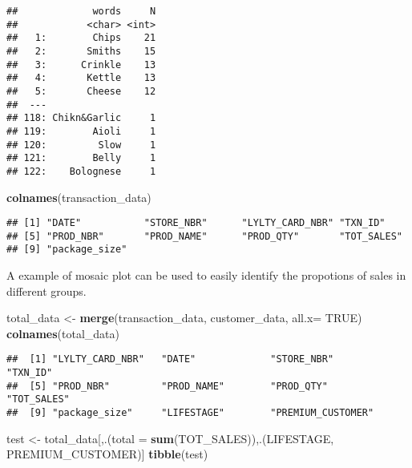 \documentclass[
]{article}
\newenvironment{Shaded}{\begin{snugshade}}{\end{snugshade}}
\newcommand{\AttributeTok}[1]{\textcolor[rgb]{0.13,0.29,0.53}{#1}}
\newcommand{\ConstantTok}[1]{\textcolor[rgb]{0.56,0.35,0.01}{#1}}
\newcommand{\FunctionTok}[1]{\textcolor[rgb]{0.13,0.29,0.53}{\textbf{#1}}}
\newcommand{\NormalTok}[1]{#1}
\newcommand{\OtherTok}[1]{\textcolor[rgb]{0.56,0.35,0.01}{#1}}
\begin{document}
\begin{verbatim}
##             words     N
##            <char> <int>
##   1:        Chips    21
##   2:       Smiths    15
##   3:      Crinkle    13
##   4:       Kettle    13
##   5:       Cheese    12
##  ---                   
## 118: Chikn&Garlic     1
## 119:        Aioli     1
## 120:         Slow     1
## 121:        Belly     1
## 122:    Bolognese     1
\end{verbatim}

\begin{Shaded}
\begin{Highlighting}[]
\FunctionTok{colnames}\NormalTok{(transaction\_data)}
\end{Highlighting}
\end{Shaded}

\begin{verbatim}
## [1] "DATE"           "STORE_NBR"      "LYLTY_CARD_NBR" "TXN_ID"        
## [5] "PROD_NBR"       "PROD_NAME"      "PROD_QTY"       "TOT_SALES"     
## [9] "package_size"
\end{verbatim}

A example of mosaic plot can be used to easily identify the propotions
of sales in different groups.

\begin{Shaded}
\begin{Highlighting}[]
\NormalTok{total\_data }\OtherTok{\textless{}{-}} \FunctionTok{merge}\NormalTok{(transaction\_data, customer\_data, }\AttributeTok{all.x=} \ConstantTok{TRUE}\NormalTok{)}
\FunctionTok{colnames}\NormalTok{(total\_data)}
\end{Highlighting}
\end{Shaded}

\begin{verbatim}
##  [1] "LYLTY_CARD_NBR"   "DATE"             "STORE_NBR"        "TXN_ID"          
##  [5] "PROD_NBR"         "PROD_NAME"        "PROD_QTY"         "TOT_SALES"       
##  [9] "package_size"     "LIFESTAGE"        "PREMIUM_CUSTOMER"
\end{verbatim}

\begin{Shaded}
\begin{Highlighting}[]
\NormalTok{test }\OtherTok{\textless{}{-}}\NormalTok{ total\_data[,.(}\AttributeTok{total =} \FunctionTok{sum}\NormalTok{(TOT\_SALES)),.(LIFESTAGE, PREMIUM\_CUSTOMER)]}
\FunctionTok{tibble}\NormalTok{(test)}
\end{Highlighting}
\end{Shaded}
\end{document}
